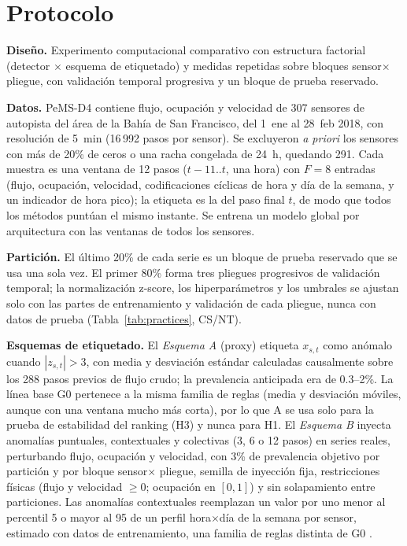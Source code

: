 \documentclass[conference]{IEEEtran}
\begin{document}
\section{Protocolo}

\textbf{Dise\~no.} Experimento computacional comparativo con estructura
factorial (detector $\times$ esquema de etiquetado) y medidas repetidas sobre
bloques sensor$\times$pliegue, con validaci\'on temporal progresiva y un bloque
de prueba reservado.

\textbf{Datos.} PeMS-D4 \cite{guo2019astgcn} contiene flujo, ocupaci\'on y
velocidad de 307 sensores de autopista del \'area de la Bah\'ia de San
Francisco, del 1~ene al 28~feb 2018, con resoluci\'on de 5~min (16\,992
pasos por sensor). Se excluyeron \emph{a priori} los sensores con m\'as de 20\%
de ceros o una racha congelada de 24~h, quedando 291.
Cada muestra es una ventana de 12 pasos ($t-11..t$, una hora) con $F=8$
entradas (flujo, ocupaci\'on, velocidad, codificaciones c\'iclicas de hora y
d\'ia de la semana, y un indicador de hora pico); la etiqueta es la del paso
final $t$, de modo que todos los m\'etodos punt\'uan el mismo instante. Se entrena
un modelo global por arquitectura con las ventanas de todos los sensores.

\textbf{Partici\'on.} El \'ultimo 20\% de cada serie es un bloque de prueba
reservado que se usa una sola vez. El primer 80\% forma tres pliegues
progresivos de validaci\'on temporal; la normalizaci\'on z-score, los
hiperpar\'ametros y los umbrales se ajustan solo con las partes de
entrenamiento y validaci\'on de cada pliegue, nunca con datos de prueba
(Tabla~\ref{tab:practices}, CS/NT).

\textbf{Esquemas de etiquetado.} El \emph{Esquema A} (proxy) etiqueta
$x_{s,t}$ como an\'omalo cuando $|z_{s,t}|>3$, con media y desviaci\'on
est\'andar calculadas causalmente sobre los 288 pasos previos de flujo crudo; la prevalencia
anticipada era de 0.3--2\%.
La l\'inea base G0 pertenece a la misma familia de reglas (media y desviaci\'on
m\'oviles, aunque con una ventana mucho m\'as corta), por lo que A se usa solo
para la prueba de estabilidad del ranking (H3) y nunca para H1. El
\emph{Esquema B} inyecta anomal\'ias puntuales, contextuales y colectivas (3,
6 o 12 pasos) en series reales, perturbando flujo, ocupaci\'on y velocidad,
con 3\% de prevalencia objetivo por partici\'on y por bloque sensor$\times$
pliegue, semilla de inyecci\'on fija, restricciones f\'isicas (flujo y
velocidad $\geq 0$; ocupaci\'on en $[0,1]$) y sin solapamiento entre
particiones. Las anomal\'ias contextuales reemplazan un valor por uno menor al
percentil 5 o mayor al 95 de un perfil hora$\times$d\'ia de la semana por
sensor, estimado con datos de entrenamiento, una familia de reglas distinta de
G0 \cite{lai2021revisiting}.
\end{document}
